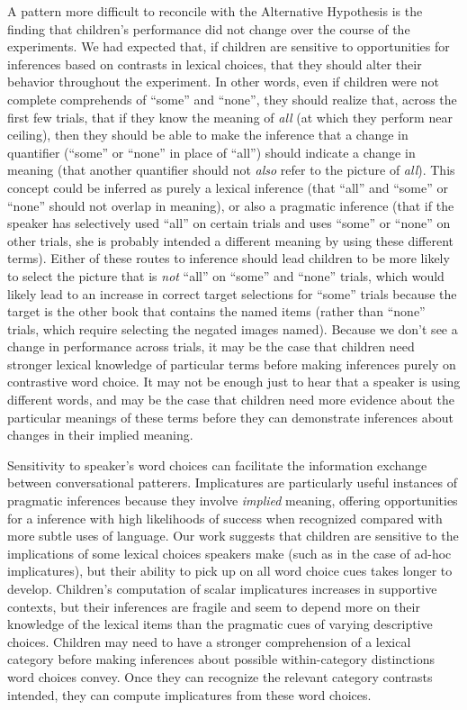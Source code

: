 \documentclass[10pt,letterpaper]{article}
\begin{document}
A pattern more difficult to reconcile with the Alternative Hypothesis is the finding that children's performance did not change over the course of the experiments. We had expected that, if children are sensitive to opportunities for inferences based on contrasts in lexical choices, that they should alter their behavior throughout the experiment. In other words, even if children were not complete comprehends of ``some'' and ``none'', they should realize that, across the first few trials, that if they know the meaning of \emph{all} (at which they perform near ceiling), then they should be able to make the inference that a change in quantifier (``some'' or ``none'' in place of ``all'') should indicate a change in meaning (that another quantifier should not \emph{also} refer to the picture of \emph{all}).  This concept could be inferred as purely a lexical inference (that ``all'' and ``some'' or ``none'' should not overlap in meaning), or also a pragmatic inference (that if the speaker has selectively used ``all'' on certain trials and uses ``some'' or ``none'' on other trials, she is probably intended a different meaning by using these different terms).  Either of these routes to inference should lead children to be more likely to select the picture that is \emph{not} ``all'' on ``some'' and ``none'' trials, which would likely lead to an increase in correct target selections for ``some'' trials because the target is the other book that contains the named items (rather than ``none'' trials, which require selecting the negated images named). Because we don't see a change in performance across trials, it may be the case that children need stronger lexical knowledge of particular terms before making inferences purely on contrastive word choice. It may not be enough just to hear that a speaker is using different words, and may be the case that children need more evidence about the particular meanings of these terms before they can demonstrate inferences about changes in their implied meaning. 

Sensitivity to speaker's word choices can facilitate the information exchange between conversational patterers. Implicatures are particularly useful instances of pragmatic inferences because they involve \emph{implied} meaning, offering opportunities for a inference with high likelihoods of success when recognized compared with more subtle uses of language. Our work suggests that children are sensitive to the implications of some lexical choices speakers make (such as in the case of ad-hoc implicatures), but their ability to pick up on all word choice cues takes longer to develop.  Children's computation of scalar implicatures increases in supportive contexts, but their inferences are fragile and seem to depend more on their knowledge of the lexical items than the pragmatic cues of varying descriptive choices. Children may need to have a stronger comprehension of a lexical category before making inferences about possible within-category distinctions word choices convey.  Once they can recognize the relevant category contrasts intended, they can compute implicatures from these word choices. 
\end{document}
